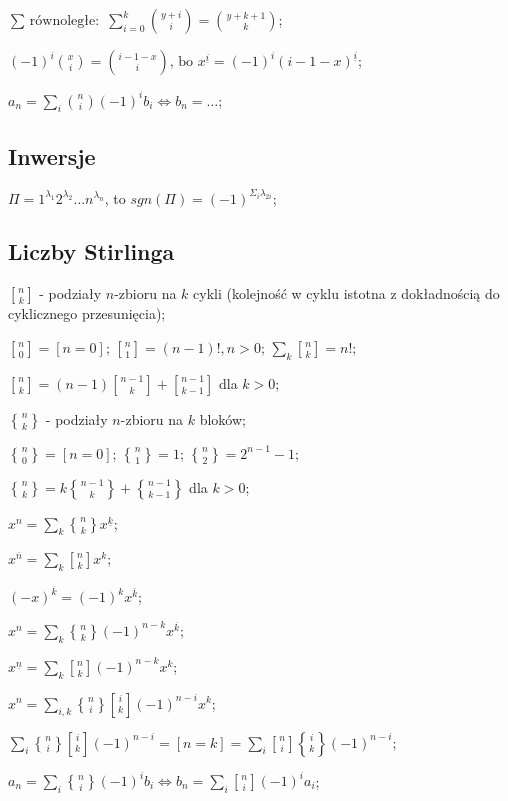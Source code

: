 $\text{$\sum$ równoległe: } \sum^k_{i=0} \binom{y + i}{i} =
  \binom{y + k + 1}{k}$;

$(-1)^i\binom{x}{i} = \binom{i - 1 - x}{i} \text{, bo }  x^{\underline{i}} =
  (-1)^i(i - 1 - x)^{\underline{i}}$;

$a_n = \sum_i\binom{n}{i}(-1)^i b_i \iff b_n = \dots$;

\subsection{Inwersje}

$\Pi = 1^{\lambda_1}2^{\lambda_2}\dots n^{\lambda_n}$, to $sgn(\Pi) =
  (-1)^{\Sigma_i\lambda_{2i}}$;

\subsection{Liczby Stirlinga}

${n \brack k}$ - podziały $n$-zbioru na $k$ cykli (kolejność w cyklu istotna z
  dokładnością do cyklicznego przesunięcia);

${n \brack 0} = [ n = 0 ]$;
${n \brack 1} = (n - 1)!, n > 0$;
$\sum_k{n \brack k} = n!$;

${n \brack k} = (n-1){n-1 \brack k}+{n-1 \brack k-1}$ dla ${k > 0}$;

${n \brace k}$ - podziały $n$-zbioru na $k$ bloków;

${n \brace 0} = [n = 0]$;
${n \brace 1} = 1$;
${n \brace 2} = 2^{n-1}-1$;

${n \brace k} = k{n-1 \brace k} + {n-1 \brace k-1}$ dla ${k > 0}$;

$x^n = \sum_k{n \brace k} x^{\underline{k}}$;

$x^{\overline{n}} = \sum_k{n \brack k}x^k$;

$(-x)^{\overline{k}} = (-1)^kx^{\overline{k}}$;

$x^n = \sum_k {n \brace k} (-1)^{n-k} x^{\overline{k}}$;

$x^{\underline{n}} = \sum_k {n \brack k} (-1)^{n-k} x^{k}$;

$x^n = \sum_{i,k} {n \brace i}{i \brack k}(-1)^{n-i}x^k$;

$\sum_i{n \brace i}{i \brack k}(-1)^{n-i} = [n=k] =
  \sum_i{n \brack i}{i \brace k}(-1)^{n-i}$;

$a_n = \sum_i{n \brace i}(-1)^ib_i \iff b_n = \sum_i{n \brack i}(-1)^ia_i$;
